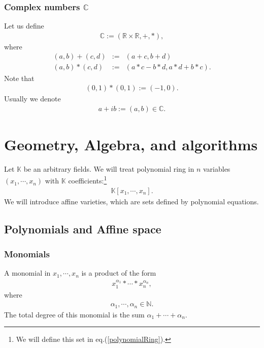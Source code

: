 \documentclass[11pt]{book}
\begin{document}
\subsection{Complex numbers $\mathbb{C}$}
Let us define
\begin{eqnarray}
\mathbb{C} := (\mathbb{R}\times \mathbb{R}, +, *),
\end{eqnarray}
where
\begin{eqnarray}
(a,b) + (c,d) &:=& (a+c, b+d) \\
(a,b) * (c,d) &:=& (a*c - b* d, a*d + b*c).
\end{eqnarray}
Note that
\begin{eqnarray}
(0,1) * (0,1) := (-1,0).
\end{eqnarray}
Usually we denote
\begin{eqnarray}
a + ib := (a,b) \in \mathbb{C}.
\end{eqnarray}


\chapter{Geometry, Algebra, and algorithms}
Let $\mathbb{K}$ be an arbitrary fields.
We will treat polynomial ring in $n$ variables $(x_1, \cdots, x_n)$ with  $\mathbb{K}$ coefficients:\footnote{ We will define this set in eq.(\ref{polynomialRing}).}
\begin{eqnarray}
\mathbb{K}[x_1,\cdots,x_n].
\end{eqnarray}
We will introduce affine varieties, which are sets defined by polynomial equations.

\section{Polynomials and Affine space}
\subsection{Monomials}
A monomial in $x_1, \cdots, x_n$ is a product of the form
\begin{eqnarray}
x_1^{\alpha_1} * \cdots * x_n^{\alpha_n},
\end{eqnarray}
where
\begin{eqnarray}
\alpha_1, \cdots, \alpha_n \in \mathbb{N}.
\end{eqnarray}
The total degree of this monomial is the sum $\alpha_1+ \cdots + \alpha_n$.
\end{document}
